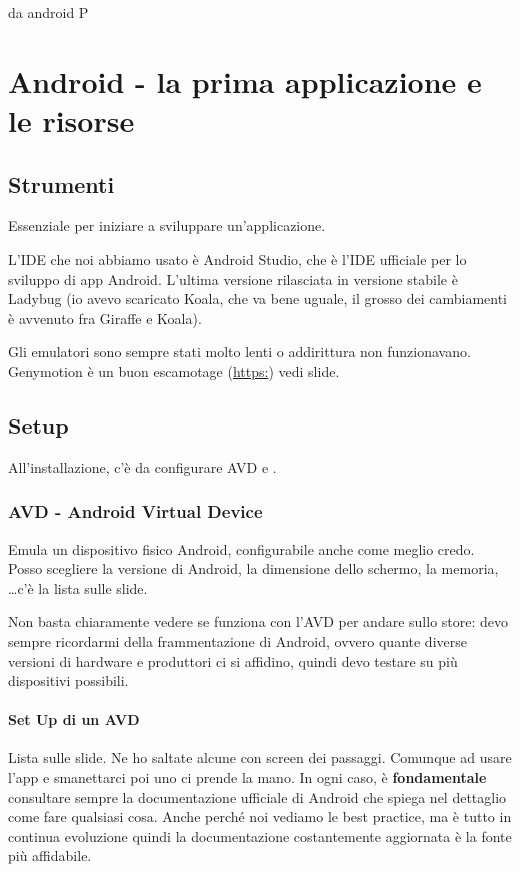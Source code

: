 da android P


\chapter{Android - la prima applicazione e le risorse}
\section{Strumenti}
\par Essenziale per iniziare a sviluppare un'applicazione.
\par L'IDE che noi abbiamo usato è Android Studio, che è l'IDE ufficiale per lo sviluppo di app Android. L'ultima versione rilasciata in versione stabile è Ladybug (io avevo scaricato Koala, che va bene uguale, il grosso dei cambiamenti è avvenuto fra Giraffe e Koala).
\par Gli emulatori sono sempre stati molto lenti o addirittura non funzionavano. Genymotion è un buon escamotage (\url{https:}) vedi slide.

\section{Setup}
\par All'installazione, c'è da configurare AVD e .

\subsection{AVD - Android Virtual Device}
\par Emula un dispositivo fisico Android, configurabile anche come meglio credo. Posso scegliere la versione di Android, la dimensione dello schermo, la memoria, \dots c'è la lista sulle slide.
\par Non basta chiaramente vedere se funziona con l'AVD per andare sullo store: devo sempre ricordarmi della frammentazione di Android, ovvero quante diverse versioni di hardware e produttori ci si affidino, quindi devo testare su più dispositivi possibili.

\subsubsection{Set Up di un AVD}
\par Lista sulle slide. Ne ho saltate alcune con screen dei passaggi. Comunque ad usare l'app e smanettarci poi uno ci prende la mano. In ogni caso, è \textbf{fondamentale} consultare sempre la documentazione ufficiale di Android che spiega nel dettaglio come fare qualsiasi cosa. Anche perché noi vediamo le best practice, ma è tutto in continua evoluzione quindi la documentazione costantemente aggiornata è la fonte più affidabile.

